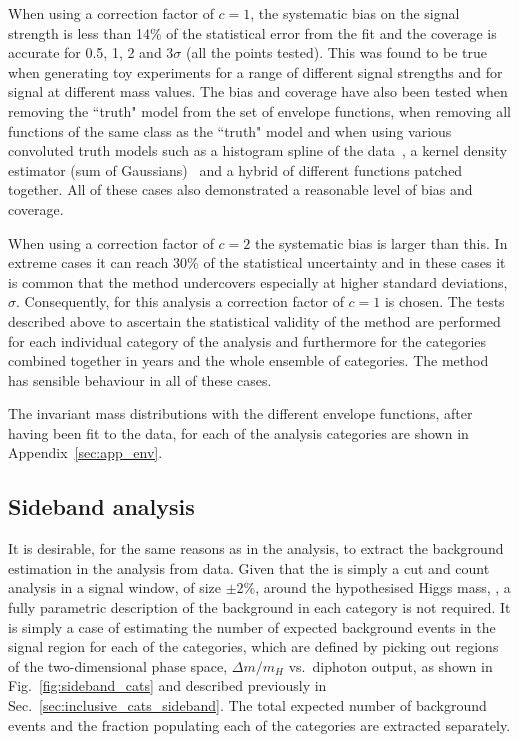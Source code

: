 When using a correction factor of $c=1$, the systematic bias on the signal strength is less than 14\% of the statistical error from the fit and the coverage is accurate for 0.5, 1, 2 and 3$\sigma$ (all the points tested). This was found to be true when generating toy experiments for a range of different signal strengths and for signal at different mass values. The bias and coverage have also been tested when removing the ``truth" model from the set of envelope functions, when removing all functions of the same class as the ``truth" model and when using various convoluted truth models such as a histogram spline of the data~\cite{regression_spline}, a kernel density estimator (sum of Gaussians)~\cite{kde} and a hybrid of different functions patched together. All of these cases also demonstrated a reasonable level of bias and coverage. 

When using a correction factor of $c=2$ the systematic bias is larger than this. In extreme cases it can reach 30\% of the statistical uncertainty and in these cases it is common that the method undercovers especially at higher standard deviations, $\sigma$. Consequently, for this analysis a correction factor of $c=1$ is chosen. The tests described above to ascertain the statistical validity of the method are performed for each individual category of the analysis and furthermore for the categories combined together in years and the whole ensemble of categories. The method has sensible behaviour in all of these cases.

The invariant mass distributions with the different envelope functions, after having been fit to the data, for each of the analysis categories are shown in Appendix~\ref{sec:app_env}. %

\subsection{Sideband analysis}

It is desirable, for the same reasons as in the \MFM analysis, to extract the background estimation in the \SMVA analysis from data. Given that the \SMVA is simply a cut and count analysis in a signal window, of size $\pm2\%$, around the hypothesised Higgs mass, \mH, a fully parametric description of the background in each category is not required. It is simply a case of estimating the number of expected background events in the signal region for each of the \SMVA categories, which are defined by picking out regions of the two-dimensional phase space, $\Delta m/m_{H}$ vs.~diphoton \BDT output, as shown in Fig.~\ref{fig:sideband_cats} and described previously in Sec.~\ref{sec:inclusive_cats_sideband}. The total expected number of background events and the fraction populating each of the \SMVA categories are extracted separately.

